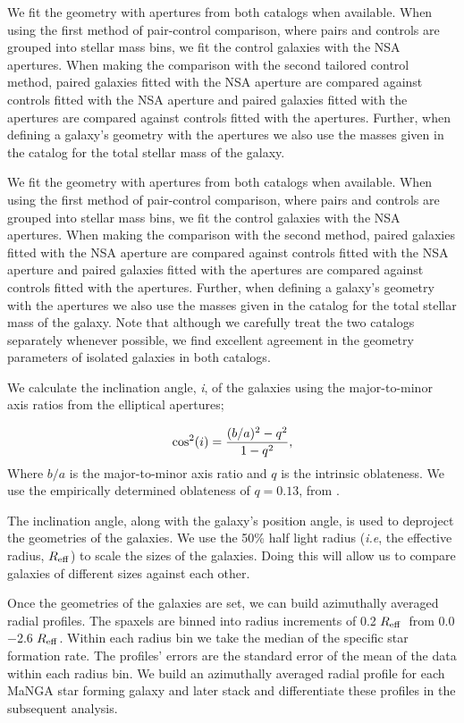 \documentclass[iop,revtex4,twocolumn,apj,numberedappendix,appendixfloats]{emulateapj}
\newcommand{\reff}{$R_{\rm eff}$}
\begin{document}
We fit the geometry with apertures from both catalogs when available. When using the first method of pair-control comparison, where pairs and controls are grouped into stellar mass bins, we fit the control galaxies with the NSA apertures. When making the comparison with the second tailored control method, paired galaxies fitted with the NSA aperture are compared against controls fitted with the NSA aperture and paired galaxies fitted with the \citet{Simard:2011} apertures are compared against controls fitted with the \citet{Simard:2011} apertures. Further, when defining a galaxy's geometry with the \citet{Simard:2011} apertures we also use the masses given in the catalog for the total stellar mass of the galaxy.

We fit the geometry with apertures from both catalogs when available. When using the first method of pair-control comparison, where pairs and controls are grouped into stellar mass bins, we fit the control galaxies with the NSA apertures. When making the comparison with the second method, paired galaxies fitted with the NSA aperture are compared against controls fitted with the NSA aperture and paired galaxies fitted with the \citet{Simard:2011} apertures are compared against controls fitted with the \citet{Simard:2011} apertures. Further, when defining a galaxy's geometry with the \citet{Simard:2011} apertures we also use the masses given in the catalog for the total stellar mass of the galaxy. Note that although we carefully treat the two catalogs separately whenever possible, we find excellent agreement in the geometry parameters of isolated galaxies in both catalogs.

We calculate the inclination angle, {\it i}, of the galaxies using the major-to-minor axis ratios from the elliptical apertures;

\begin{equation}
{\rm cos^2}(i) = \frac{(b/a)^2 - q^2}{1 - q^2},
\end{equation}
Where $b/a$ is the major-to-minor axis ratio and $q$ is the intrinsic oblateness. We use the empirically determined oblateness of $q = 0.13$, from \citet{Giovanelli:1994}.

The inclination angle, along with the galaxy's position angle, is used to deproject the geometries of the galaxies. We use the 50\% half light radius ({\it i.e}, the effective radius, \reff) to scale the sizes of the galaxies. Doing this will allow us to compare galaxies of different sizes against each other.

Once the geometries of the galaxies are set, we can build azimuthally averaged radial profiles. The spaxels are binned into radius increments of 0.2 \reff\ from 0.0$-$2.6 \reff. Within each radius bin we take the median of the specific star formation rate. The profiles' errors are the standard error of the mean of the data within each radius bin. We build an azimuthally averaged radial profile for each MaNGA star forming galaxy and later stack and differentiate these profiles in the subsequent analysis. 
\end{document}
